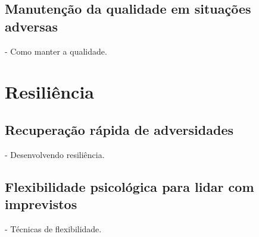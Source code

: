 \documentclass{ufersa}
\begin{document}
\subsection{Manutenção da qualidade em situações adversas}
- Como manter a qualidade.

\section{Resiliência}
\subsection{Recuperação rápida de adversidades}
- Desenvolvendo resiliência.

\subsection{Flexibilidade psicológica para lidar com imprevistos}
- Técnicas de flexibilidade.
\end{document}

